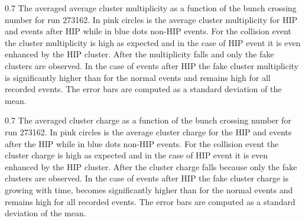                  {0.7}       %
                 {The averaged average cluster multiplicity as a function of the bunch crossing number for run 273162. In pink circles is the average cluster multiplicity for HIP and events after HIP while in blue dots non-HIP events. For the collision event the cluster multiplicity is high as expected and in the case of HIP event it is even enhanced by the HIP cluster. After the multiplicity falls and only the fake clusters are observed. In the case of events after HIP the fake cluster multiplicity is significantly higher than for the normal events and remains high for all recorded events. The error bars are computed as a standard deviation of the mean. } %

                 {0.7}       %
                 {The averaged cluster charge as a function of the bunch crossing number for run 273162. In pink circles is the average cluster charge for the HIP and events after the HIP while in blue dots non-HIP events. For the collision event the cluster charge is high as expected and in the case of HIP event it is even enhanced by the HIP cluster. After the cluster charge falls because only the fake clusters are observed. In the case of events after HIP the fake cluster charge is growing with time, becomes significantly higher than for the normal events and remains high for all recorded events. The error bars are computed as a standard deviation of the mean. } %

\begin{table}
\begin{center}
\caption[Table caption text]{The average cluster charge, multiplicity and width and the fraction of clusters larger than 10 strips for four categories defined in Tab.~\ref{tab:eventCategories} for run 273162. The quantities are computed from both on-track and off-track clusters.}
\label{tab:clusterCategories}
\end{center}
\end{table}

